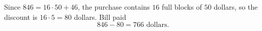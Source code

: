 Since $846=16\cdot50+46$, the purchase contains $16$ full blocks of $50$ dollars, so the discount is $16\cdot5=80$ dollars. Bill paid
\[
846-80=\boxed{766}\text{ dollars}.
\]
